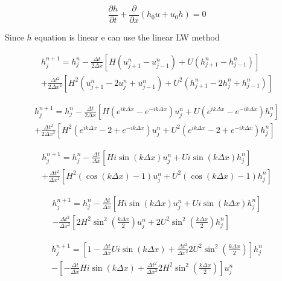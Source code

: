 \documentclass[12pt]{article}
\begin{document}
\[\frac{\partial h}{\partial t} + \frac{\partial}{\partial x} \left(h_0 u + u_0 h\right)= 0\]

Since $h$ equation is linear e can use the linear LW method

\begin{multline*}
h^{n+1}_{j} = h^{n}_{j} - \frac{\Delta t}{2\Delta x}\left[H\left(u^{n}_{j+1} - u^{n}_{j-1}  \right) + U\left(h^{n}_{j+1} - h^{n}_{j-1}  \right)\right]  \\+ \frac{\Delta t^2}{2\Delta x^2}\left[H^2\left(u^{n}_{j+1} -2u^n_j + u^{n}_{j-1}  \right) + U^2\left(h^{n}_{j+1} -2h^n_j + h^{n}_{j-1}  \right)\right]
\end{multline*}

\begin{multline*}
h^{n+1}_{j} = h^{n}_{j} - \frac{\Delta t}{2\Delta x}\left[H\left(e^{ik\Delta x} - e^{-ik\Delta x}  \right)u^{n}_{j} + U\left(e^{ik\Delta x} - e^{-ik\Delta x}  \right)h^{n}_{j}\right]  \\+ \frac{\Delta t^2}{2\Delta x^2}\left[H^2\left(e^{ik\Delta x}  -2 + e^{-ik\Delta x}   \right)u^n_j + U^2\left(e^{ik\Delta x}  -2 + e^{-ik\Delta x}   \right)h^n_j\right]
\end{multline*}

\begin{multline*}
h^{n+1}_{j} = h^{n}_{j} - \frac{\Delta t}{\Delta x}\left[Hi\sin\left(k\Delta x\right)u^{n}_{j} + Ui\sin\left(k\Delta x\right)h^{n}_{j}\right]  \\+ \frac{\Delta t^2}{\Delta x^2}\left[H^2\left(\cos\left(k\Delta x\right)  -1  \right)u^n_j + U^2\left(\cos\left(k\Delta x\right)  -1  \right)h^n_j\right]
\end{multline*}

\begin{multline*}
h^{n+1}_{j} = h^{n}_{j} - \frac{\Delta t}{\Delta x}\left[Hi\sin\left(k\Delta x\right)u^{n}_{j} + Ui\sin\left(k\Delta x\right)h^{n}_{j}\right]  \\- \frac{\Delta t^2}{\Delta x^2}\left[2H^2\sin^2\left(\frac{k\Delta x}{2}\right)u^n_j + 2U^2\sin^2\left(\frac{k\Delta x}{2}\right)h^n_j\right]
\end{multline*}

\begin{multline*}
h^{n+1}_{j} = \left[1 - \frac{\Delta t}{\Delta x}Ui\sin\left(k\Delta x\right)  + \frac{\Delta t^2}{\Delta x^2}2U^2\sin^2\left(\frac{k\Delta x}{2}\right)\right]h^{n}_{j} \\ - \left[- \frac{\Delta t}{\Delta x}Hi\sin\left(k\Delta x\right)  + \frac{\Delta t^2}{\Delta x^2}2H^2\sin^2\left(\frac{k\Delta x}{2}\right)\right]u^{n}_{j}
\end{multline*}
\end{document}
